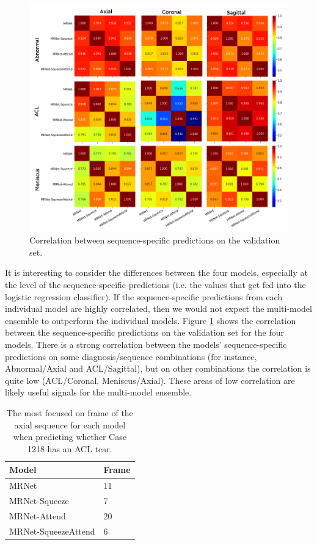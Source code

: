 \documentclass[10pt,twocolumn,letterpaper]{article}
\begin{document}
\begin{figure}[h!]
\begin{center}
\includegraphics[width=0.9\linewidth]{../images/corr2/corr2.png}
\end{center}
   \caption{Correlation between sequence-specific predictions on the validation set.}
\label{fig:corr}
\end{figure}



It is interesting to consider the differences between the four models, especially at the level of the sequence-specific predictions (i.e. the values that get fed into the logistic regression classifier). If the sequence-specific predictions from each individual model are highly correlated, then we would not expect the multi-model ensemble to outperform the individual models. Figure \ref{fig:corr} shows the correlation between the sequence-specific predictions on the validation set for the four models. There is a strong correlation between the models' sequence-specific predictions on some diagnosis/sequence combinations (for instance, Abnormal/Axial and ACL/Sagittal), but on other combinations the correlation is quite low (ACL/Coronal, Meniscus/Axial). These areas of low correlation are likely useful signals for the multi-model ensemble.

\begin{table}[h!]
\begin{center}
\begin{tabular}{|l|l|}
\hline
Model & Frame \\
\hline
MRNet & 11 \\
MRNet-Squeeze & 7 \\
MRNet-Attend & 20 \\
MRNet-SqueezeAttend & 6 \\
\hline
\end{tabular}
\end{center}
\caption{The most focused on frame of the axial sequence for each model when predicting whether Case 1218 has an ACL tear.}
\label{tab:frames}
\end{table}
\end{document}
